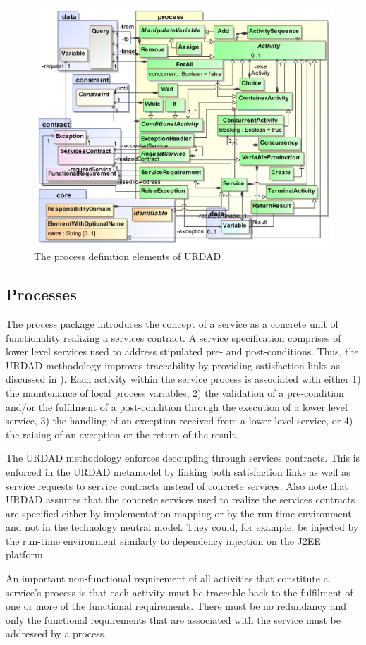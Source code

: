 \begin{figure}[Htbp]
  \centering
  \includegraphics{process}
  \caption{The process definition elements of URDAD}
  \label{fig:metamodel}
\end{figure}

\subsection{Processes}

The process package introduces the concept of a service as a concrete unit of functionality realizing a services contract. A service specification comprises of lower level services used to address stipulated pre- and post-conditions. Thus, the URDAD methodology improves traceability by providing satisfaction links as discussed in \cite{ramesh_toward_2001}). Each activity within the service process is associated with either 1) the maintenance of local process variables, 2) the validation of a pre-condition and/or the fulfilment of a post-condition through the execution of a lower level service, 3) the handling of an exception received from a lower level service, or 4) the raising of an exception or the return of the result.

The URDAD methodology enforces decoupling through services contracts. This is enforced in the URDAD metamodel by linking both satisfaction links as well as service requests to service contracts instead of concrete services. Also note that URDAD assumes that the concrete services used to realize the services contracts are specified either by implementation mapping or by the run-time environment and not in the technology neutral model. They could, for example, be injected by the run-time environment similarly to dependency injection on the J2EE platform.

An important non-functional requirement of all activities that constitute a service's process is that each activity must be traceable back to the fulfilment of one or more of the functional requirements. There must be no redundancy and only the functional requirements that are associated with the service must be addressed by a process.